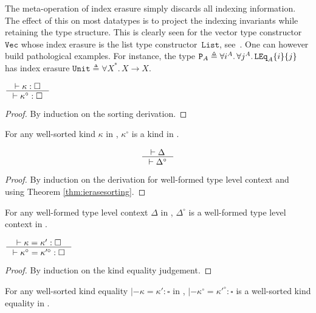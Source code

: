 \begin{example}\label{PathologicalExample}
The meta-operation of index erasure simply discards all indexing
information.  The effect of this on most datatypes is to project the
indexing invariants while retaining the type structure.  
%
This is clearly seen for the vector type constructor~$\mathtt{Vec}$ whose
index erasure is the list type constructor~$\mathtt{List}$,
see~. 
%
One can however build pathological examples.  For instance, the
type $\mathtt P_A \triangleq \forall i^A.\,\forall j^A.\, \mathtt{LEq}_A\{i\} \{j\}$
has index erasure $\mathtt{Unit} \triangleq \forall X^\mathtt{*}.\,X\to
X$.
\end{example}

\begin{theorem}
\label{thm:ierasesorting}
	$\inference{|- \kappa : \square}{|- \kappa^\circ : \square}$
\end{theorem}
\begin{proof}
	By induction on the sorting derivation.
\end{proof}
\begin{remark}
For any well-sorted kind $\kappa$ in \Fi,
$\kappa^\circ$ is a kind in \Fw.
\end{remark}

\begin{theorem}
\label{thm:ierasetyctx}
\[ \inference{|- \Delta}{|- \Delta^\circ} \]
\end{theorem}
\begin{proof}
	By induction on the derivation for well-formed type level context
	and using Theorem \ref{thm:ierasesorting}.
\end{proof}
\begin{remark}
For any well-formed type level context $\Delta$ in \Fi,
$\Delta^\circ$ is a well-formed type level context in \Fw.
\end{remark}

\begin{theorem}\label{thm:ierasekindeq}
$ \inference{|- \kappa=\kappa':\square}
	{|- \kappa^\circ=\kappa'^\circ:\square}
$
\end{theorem}
\begin{proof}
	By induction on the kind equality judgement.
\end{proof}
\begin{remark}
For any well-sorted kind equality $|- \kappa=\kappa':\square$ in \Fi,
$|- \kappa^\circ=\kappa'^\circ:\square$ is a well-sorted kind equality in \Fw.
\end{remark}

